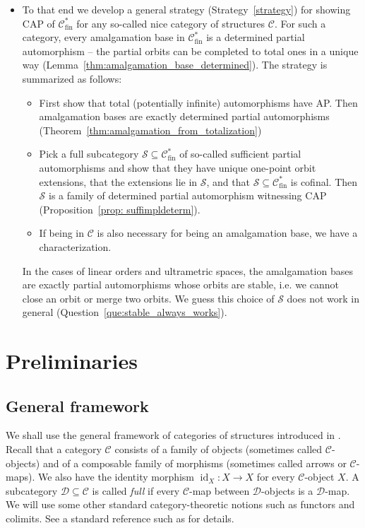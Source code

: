 \documentclass[oneside,notitlepage,12pt]{article}
\theoremstyle{definition}
\theoremstyle{remark}
\newcommand \maps {\colon} %
\newcommand \id [1]{{\operatorname{id}_{#1}}}
\newcommand \subs {\subseteq}
\newcommand \Su {\mathscr{S}}
\newcommand \C {\mathscr{C}}
\newcommand \D {\mathscr{D}}
\newcommand \fin {{\operatorname{fin}}}
\begin{document}
\begin{itemize}
    \item To that end we develop a general strategy (Strategy~\ref{strategy}) for showing CAP of $\C^*_\fin$ for any so-called nice category of structures $\C$.
    For such a category, every amalgamation base in $\C^*_\fin$ is a determined partial automorphism -- the partial orbits can be completed to total ones in a unique way (Lemma~\ref{thm:amalgamation_base_determined}).
    The strategy is summarized as follows:
    \begin{itemize}
        \item First show that total (potentially infinite) automorphisms have AP.
        Then amalgamation bases are exactly determined partial automorphisms (Theorem~\ref{thm:amalgamation_from_totalization})
        \item Pick a full subcategory $\Su \subs \C^*_\fin$ of so-called sufficient partial automorphisms and show that they have unique one-point orbit extensions, that the extensions lie in $\Su$, and that $\Su \subs \C^*_\fin$ is cofinal.
        Then $\Su$ is a family of determined partial automorphism witnessing CAP (Proposition~\ref{prop: suffimpldeterm}).
        \item If being in $\C$ is also necessary for being an amalgamation base, we have a characterization.
    \end{itemize}
    In the cases of linear orders and ultrametric spaces, the amalgamation bases are exactly partial automorphisms whose orbits are stable, i.e. we cannot close an orbit or merge two orbits.
    We guess this choice of $\Su$ does not work in general (Question~\ref{que:stable_always_works}).
\end{itemize}



\section{Preliminaries}


\subsection{General framework}

We shall use the general framework of categories of structures introduced in \cite{paper1}.
Recall that a category $\C$ consists of a family of objects (sometimes called $\C$-objects) and of a composable family of morphisms (sometimes called arrows or $\C$-maps).
We also have the identity morphism $\id{X}\maps X \to X$ for every $\C$-object $X$.
A subcategory $\D \subseteq \C$ is called \emph{full} if every $\C$-map between $\D$-objects is a $\D$-map.
We will use some other standard category-theoretic notions such as functors and colimits. See a standard reference such as \cite{MacLane} for details.
\end{document}

